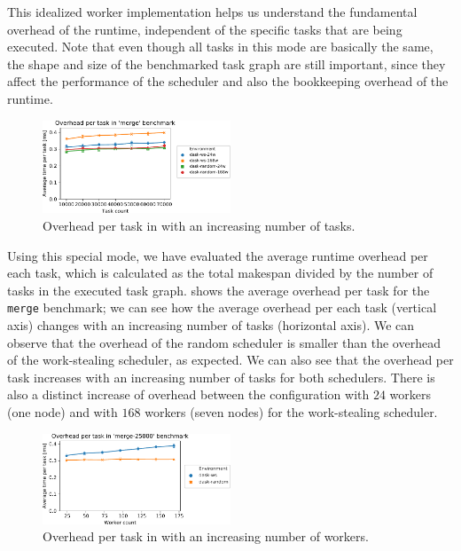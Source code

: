 This idealized worker implementation helps us understand the fundamental overhead of the
\dask{} runtime, independent of the specific tasks that are being executed.
Note that even though all tasks in this mode are basically the same, the shape and size of the
benchmarked task graph are still important, since they affect the performance of the scheduler and
also the bookkeeping overhead of the runtime.

\begin{figure}
	\centering
	\includegraphics[width=0.5\textwidth]{imgs/rsds/charts/dask-merge-task-scaling}
	\caption{Overhead per task in \dask{} with an increasing number of tasks.}
	\label{fig:dask-merge-task-scaling}
\end{figure}

Using this special mode, we have evaluated the average runtime overhead per each task, which is
calculated as the total makespan divided by the number of tasks in the executed task graph.
 shows the average overhead per task for the \texttt{merge}
benchmark; we can see how the average overhead per each task (vertical axis) changes with an
increasing number of tasks (horizontal axis). We can observe that the overhead of the random
scheduler is smaller than the overhead of the work-stealing scheduler, as expected. We can also see
that the overhead per task increases with an increasing number of tasks for both schedulers. There
is also a distinct increase of overhead between the configuration with $24$
workers (one node) and with $168$ workers (seven nodes) for the work-stealing
scheduler.

\begin{figure}
	\centering
	\includegraphics[width=0.5\textwidth]{imgs/rsds/charts/dask-merge-worker-scaling}
	\caption{Overhead per task in \dask{} with an increasing number of workers.}
	\label{fig:dask-merge-worker-scaling}
\end{figure}

